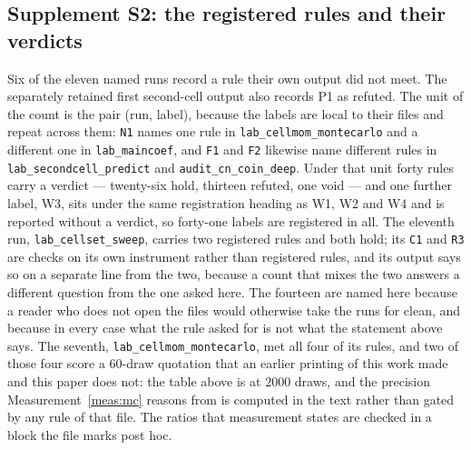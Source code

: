 \documentclass[11pt,a4paper]{article}
\theoremstyle{plain}
\theoremstyle{definition}
\theoremstyle{remark}
\begin{document}
\subsection*{Supplement S2: the registered rules and their verdicts}

Six of the eleven named runs record a rule their own output did not meet.
The separately retained first second-cell output also records P1 as
refuted. The
unit of the count is the pair (run, label), because the labels are
local to their files and repeat across them: \texttt{N1} names one
rule in \texttt{lab\_cellmom\_montecarlo} and a different one in
\texttt{lab\_maincoef}, and \texttt{F1} and \texttt{F2} likewise name
different rules in \texttt{lab\_secondcell\_predict} and
\texttt{audit\_cn\_coin\_deep}. Under that unit forty rules
carry a verdict --- twenty-six hold, thirteen refuted, one void ---
and one further label, W3, sits under the same registration heading as
W1, W2 and W4 and is reported without a verdict, so forty-one labels
are registered in all. The eleventh run,
\texttt{lab\_cellset\_sweep}, carries two registered rules and both
hold; its \texttt{C1} and \texttt{R3} are checks on its own instrument
rather than registered rules, and its output says so on a separate line
from the two, because a count that mixes the two answers a different
question from the one asked here. The fourteen are named here because a
reader who does not open the files would otherwise take the runs for
clean, and because in every case what the rule asked for is not what
the statement above says. The seventh,
\texttt{lab\_cellmom\_montecarlo}, met all four of its rules, and
two of those four score a $60$-draw quotation that an earlier printing
of this work made and this paper does not: the table above is at
$2000$ draws, and the precision Measurement~\ref{meas:mc} reasons from
is computed in the text rather than gated by any rule of that file.
The ratios that measurement states are checked in a block the file
marks post hoc.
\end{document}
